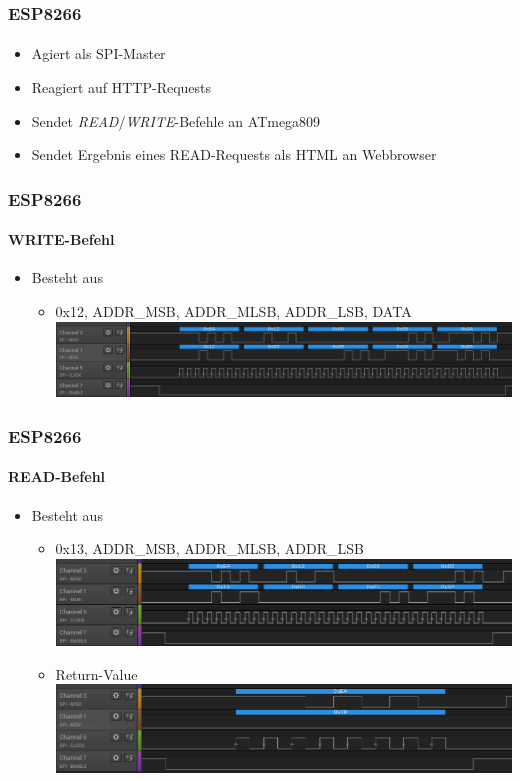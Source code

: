 \documentclass{beamer}
\begin{document}
\begin{frame}

	\frametitle{ESP8266}
	\framesubtitle{}
	\begin{itemize}
		\item Agiert als SPI-Master
		\item Reagiert auf HTTP-Requests
		\item Sendet \textit{READ}/\textit{WRITE}-Befehle an ATmega809
		\item Sendet Ergebnis eines READ-Requests als HTML an Webbrowser
	\end{itemize}
	
\end{frame}

\begin{frame}

	\frametitle{ESP8266}
	\framesubtitle{WRITE-Befehl}
	\begin{itemize}
		\item Besteht aus
		\begin{itemize}
			\item 0x12, ADDR\_MSB, ADDR\_MLSB, ADDR\_LSB, DATA\\
			\includegraphics[scale=0.375]{images/SPI_Write_CMD_capture.png}
		\end{itemize}
	\end{itemize}
	
\end{frame}

\begin{frame}

	\frametitle{ESP8266}
	\framesubtitle{READ-Befehl}
	\begin{itemize}
		\item Besteht aus
		\begin{itemize}
			\item 0x13, ADDR\_MSB, ADDR\_MLSB, ADDR\_LSB\\
			\includegraphics[scale=0.4]{images/SPI_Read_CMD_capture_01.png}
			\item Return-Value\\
			\includegraphics[scale=0.4]{images/SPI_Read_CMD_capture_02.png}
		\end{itemize}
	\end{itemize}
	
\end{frame}
\end{document}
